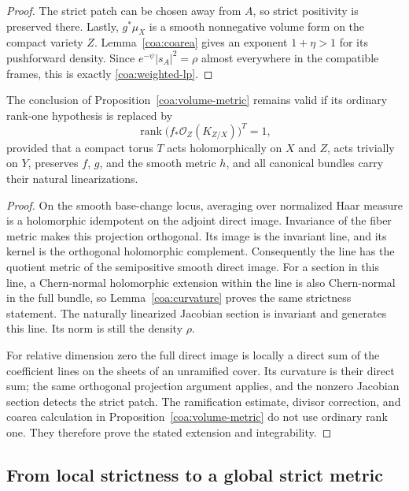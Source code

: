 \begin{proof}
The strict patch can be chosen away from $A$, so strict positivity is
preserved there.  Lastly, $g^*\mu_X$ is a smooth nonnegative volume form
on the compact variety $Z$.  Lemma~\ref{coa:coarea} gives an exponent
$1+\eta>1$ for its pushforward density.  Since
$e^{-\psi}|s_A|^2=\rho$ almost everywhere in the compatible frames,
this is exactly \eqref{coa:weighted-lp}.
\end{proof}

\begin{corollary}\label{coa:invariant-volume-metric}
The conclusion of Proposition~\ref{coa:volume-metric} remains valid if
its ordinary rank-one hypothesis is replaced by
\[
 \operatorname{rank}\bigl(f_*\mathcal O_Z(K_{Z/X})\bigr)^T=1,
\]
provided that a compact torus $T$ acts holomorphically on $X$ and $Z$,
acts trivially on $Y$, preserves $f$, $g$, and the smooth metric $h$,
and all canonical bundles carry their natural linearizations.
\end{corollary}

\begin{proof}
On the smooth base-change locus, averaging over normalized Haar measure
is a holomorphic idempotent on the adjoint direct image.  Invariance of
the fiber metric makes this projection orthogonal.  Its image is the
invariant line, and its kernel is the orthogonal holomorphic complement.
Consequently the line has the quotient metric of the semipositive
smooth direct image.  For a section in this line, a Chern-normal
holomorphic extension within the line is also Chern-normal in the full
bundle, so Lemma~\ref{coa:curvature} proves the same strictness statement.
The naturally linearized Jacobian section is invariant and generates
this line.  Its norm is still the density $\rho$.

For relative dimension zero the full direct image is locally a direct
sum of the coefficient lines on the sheets of an unramified cover.
Its curvature is their direct sum; the same orthogonal projection
argument applies, and the nonzero Jacobian section detects the strict
patch.  The ramification estimate, divisor correction, and coarea
calculation in Proposition~\ref{coa:volume-metric} do not use ordinary
rank one.  They therefore prove the stated extension and integrability.
\end{proof}

\subsection{From local strictness to a global strict metric}

